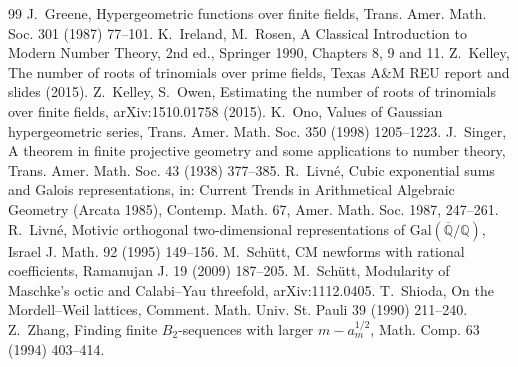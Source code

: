 \documentclass[11pt]{article}
\begin{document}
\begin{thebibliography}{99}
 J.~Greene, Hypergeometric functions over finite fields, Trans. Amer. Math. Soc. 301 (1987) 77--101.
 K.~Ireland, M.~Rosen, A Classical Introduction to Modern Number Theory, 2nd ed., Springer 1990, Chapters 8, 9 and 11.
 Z.~Kelley, The number of roots of trinomials over prime fields, Texas A\&M REU report and slides (2015).
 Z.~Kelley, S.~Owen, Estimating the number of roots of trinomials over finite fields, arXiv:1510.01758 (2015).
 K.~Ono, Values of Gaussian hypergeometric series, Trans. Amer. Math. Soc. 350 (1998) 1205--1223.
 J.~Singer, A theorem in finite projective geometry and some applications to number theory, Trans. Amer. Math. Soc. 43 (1938) 377--385.
 R.~Livn\'e, Cubic exponential sums and Galois representations, in: Current Trends in Arithmetical Algebraic Geometry (Arcata 1985), Contemp. Math. 67, Amer. Math. Soc. 1987, 247--261.
 R.~Livn\'e, Motivic orthogonal two-dimensional representations of $\mathrm{Gal}(\overline{\mathbb Q}/\mathbb Q)$, Israel J. Math. 92 (1995) 149--156.
 M.~Sch\"utt, CM newforms with rational coefficients, Ramanujan J. 19 (2009) 187--205.
 M.~Sch\"utt, Modularity of Maschke's octic and Calabi--Yau threefold, arXiv:1112.0405.
 T.~Shioda, On the Mordell--Weil lattices, Comment. Math. Univ. St. Pauli 39 (1990) 211--240.
 Z.~Zhang, Finding finite $B_2$-sequences with larger $m-a_m^{1/2}$, Math. Comp. 63 (1994) 403--414.
\end{thebibliography}
\end{document}
